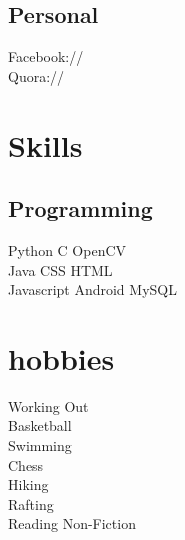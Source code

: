 \documentclass[]{deedy-resume-openfont}
\begin{document}
\begin{minipage}[t]{0.33\textwidth}
\subsection{Personal}
Facebook://  \href{https://www.facebook.com/rishi.prasad.56}{} \\

Quora://  \href{https://www.quora.com/profile/Rishi-Prasad}{}
\sectionsep



\section{Skills}
\subsection{Programming}
Python \textbullet{}   C \textbullet{} OpenCV \\
Java \textbullet{} CSS \textbullet{} HTML  \\ 
Javascript \textbullet{} Android \textbullet{}  MySQL
\sectionsep


\section{hobbies} 


\textbullet{}  Working Out\\
\textbullet{}  Basketball\\
\textbullet{}  Swimming\\
\textbullet{}  Chess \\
\textbullet{}  Hiking\\
\textbullet{}  Rafting\\
\textbullet{}  Reading Non-Fiction\\


\sectionsep


%
%

\end{minipage} 
\hfill
\end{document}

